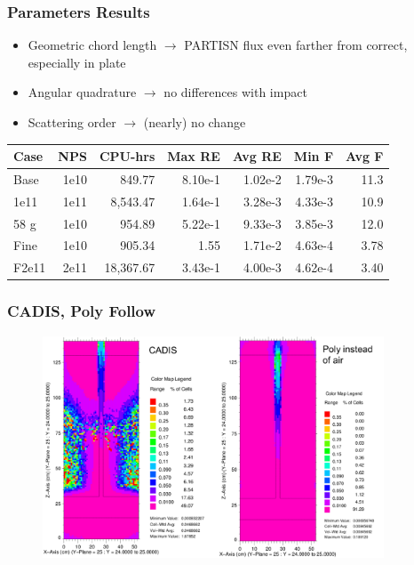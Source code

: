 \documentclass[xcolor=x11names,compress]{beamer}
\renewcommand{\(}{\begin{columns}}
\renewcommand{\)}{\end{columns}}
\newcommand{\<}[1]{\begin{column}{#1}}
\renewcommand{\>}{\end{column}}
\begin{document}
\begin{frame}[fragile]
  \frametitle{Parameters Results}
  
  	\begin{itemize}
  	\item Geometric chord length $\rightarrow$ PARTISN flux even farther from correct, especially in plate
  	\item Angular quadrature $\rightarrow$ no differences with impact
	\item Scattering order $\rightarrow$ (nearly) no change
  	\end{itemize}
  	
  \begin{center}
    \begin{tabu}{|l|r|r|r|r|r|r|}\hline
      Case & NPS & CPU-hrs & Max RE & Avg RE & Min F & Avg F\\\hline
Base      & 1e10 & 849.77    & 8.10e-1 & 1.02e-2 & 1.79e-3 & 11.3\\
%
1e11 & 1e11 & 8,543.47  & 1.64e-1 & 3.28e-3 & 4.33e-3 & 10.9\\
%
58 g & 1e10 & 954.89    & 5.22e-1 & 9.33e-3 & 3.85e-3 & 12.0\\
%
Fine & 1e10 & 905.34    & 1.55  & 1.71e-2 & 4.63e-4 & 3.78\\
%
F2e11 & 2e11 & 18,367.67 & 3.43e-1 & 4.00e-3 & 4.62e-4 & 3.40\\\hline
    \end{tabu}
  \end{center}

\end{frame}

\begin{frame}[fragile]
  \frametitle{CADIS, Poly Follow}
 \begin{figure}[p]
   \begin{center}
     \includegraphics[width=4in,clip]{cadis-poly}
   \end{center}
 \end{figure}
\end{frame}
\end{document}
